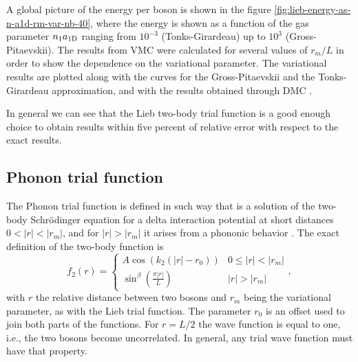 A global picture of the energy per boson is shown in the figure
\ref{fig:lieb-energy-as-n-a1d-rm-var-nb-40}, where the energy is shown as a
function of the gas parameter ${{n}_1} a_{ \mathrm{1D} }$ ranging from $10^{-3}$
(Tonks-Girardeau) up to $10^{3}$ (Gross-Pitaevskii). The results from {VMC} were
calculated for several values of $r_m / L$ in order to show the dependence on
the variational parameter. The variational results are plotted along with the
curves for the Gross-Pitaevskii and the Tonks-Girardeau approximation, and with
the results obtained through DMC
\cite{bib:astrakharchik-phys-rev-a.68.031602.2003}.

In general we can see that the Lieb two-body trial function is a good enough
choice to obtain results within five percent of relative error with respect to
the exact results.
%

\subsection{Phonon trial function}

The Phonon trial function is defined in such way that is a solution of the
two-body Schrödinger equation for a delta interaction potential at short
distances $0 < |r| < |r_m|$, and for $|r| > |r_m|$ it arises from a phononic
behavior \cite[]{bib:reatto-phys-rev.155.1967} . The exact definition of the
two-body function is
%
\begin{equation}
  \label{eq:vmc-phonon-two-body-function}
  f_2(r) = \begin{cases}
    A \cos(k_2(|r| - r_0))                      & 0 \leq|r| < |r_m| \\
    \sin^{\beta}\left(\frac{\pi |r|}{L} \right) & |r| > |r_m|
  \end{cases},
\end{equation}
%
with $r$ the relative distance between two bosons and $r_m$ being the
variational parameter, as with the Lieb trial function. The parameter $r_0$ is
an offset used to join both parts of the functions. For $r = L/2$ the wave
function is equal to one, i.e., the two bosons become uncorrelated. In general,
any trial wave function must have that property.

